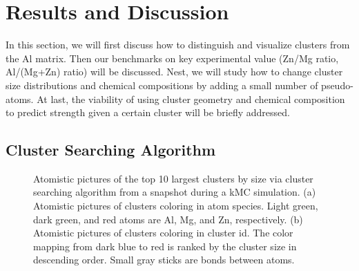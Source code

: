 \section{Results and Discussion}
\label{Chap:Al/Vac:section:RD}

In this section, we will first discuss how to distinguish and visualize clusters from the Al matrix. Then our benchmarks on key experimental value (Zn/Mg ratio, Al/(Mg+Zn) ratio) will be discussed. Nest, we will study how to change cluster size distributions and chemical compositions by adding a small number of pseudo-atoms. At last, the viability of using cluster geometry and chemical composition to predict strength given a certain cluster will be briefly addressed.


\subsection{Cluster Searching Algorithm}

\begingroup
\begin{figure}[!ht]
  \centering
\caption[Atomistic pictures of the top 10 largest clusters by size via cluster searching algorithm.]{Atomistic pictures of the top 10 largest clusters by size via cluster searching algorithm from a snapshot during a kMC simulation. (a) Atomistic pictures of clusters coloring in atom species. Light green, dark green, and red atoms are Al, Mg, and Zn, respectively. (b) Atomistic pictures of clusters coloring in cluster id. The color mapping from dark blue to red is ranked by the cluster size in descending order. Small gray sticks are bonds between atoms.}
\label{Chap:Al/Vac:fig:illu_cluster}
\end{figure}
\endgroup


